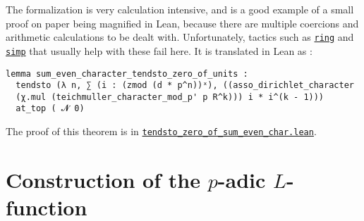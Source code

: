 \documentclass[a4paper,UKenglish,cleveref, autoref, thm-restate]{lipics-v2021}
\newcommand{\lean}[1]{\texttt{#1}\xspace} %
\begin{document}
The formalization is very calculation intensive, and is a good example of a small proof on paper being magnified in Lean, 
because there are multiple coercions and arithmetic calculations to be dealt with. %
Unfortunately, tactics such as \href{https://leanprover-community.github.io/mathlib_docs/tactics.html#ring}{\lean{ring}} and 
\href{https://leanprover-community.github.io/mathlib_docs/tactics.html#simp}{\lean{simp}} that usually help with these fail here. 
It is translated in Lean as :
\begin{lstlisting}
lemma sum_even_character_tendsto_zero_of_units :
  tendsto (λ n, ∑ (i : (zmod (d * p^n))ˣ), ((asso_dirichlet_character
  (χ.mul (teichmuller_character_mod_p' p R^k))) i * i^(k - 1))) 
  at_top ( 𝓝 0) 
\end{lstlisting}
The proof of this theorem is in \href{https://github.com/laughinggas/p-adic-L-functions/blob/main/src/tendsto_zero_of_sum_even_char.lean}{\lean{tendsto\_zero\_of\_sum\_even\_char.lean}}.
\section{Construction of the $p$-adic $L$-function}
\label{section3}
\end{document}
